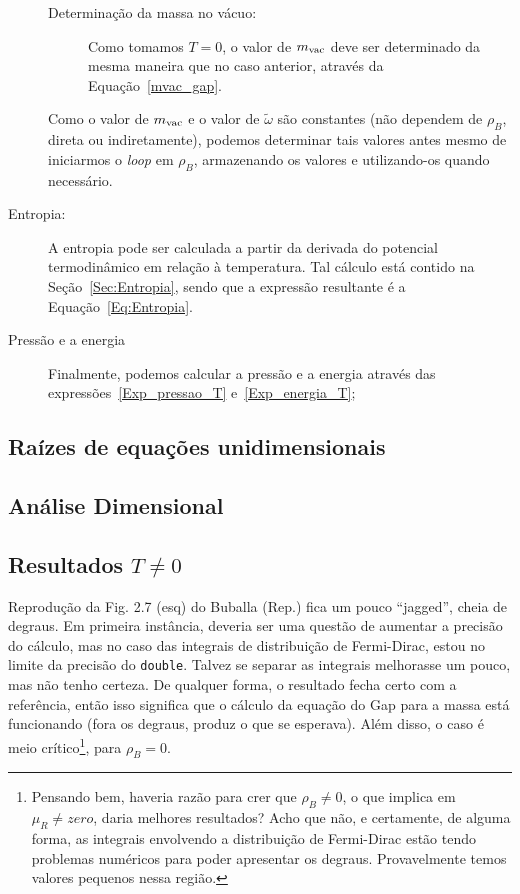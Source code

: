 \begin{description}
\begin{description}
\begin{equation}
				\end{equation}
			\item[Determinação da massa no vácuo:] Como tomamos $T = 0$, o valor de $m_{\rm{vac}}$ deve ser determinado da mesma maneira que no caso anterior, através da Equação~\eqref{mvac_gap}.
		\end{description}
		Como o valor de $m_{\rm{vac}}$ e o valor de $\tilde\omega$ são constantes (não dependem de $\rho_B$, direta ou indiretamente), podemos determinar tais valores antes mesmo de iniciarmos o \emph{loop} em $\rho_B$, armazenando os valores e utilizando-os quando necessário.
	\item[Entropia:] A entropia pode ser calculada a partir da derivada do potencial termodinâmico em relação à temperatura. Tal cálculo está contido na Seção~\ref{Sec:Entropia}, sendo que a expressão resultante é a Equação~\eqref{Eq:Entropia}.
	\item[Pressão e a energia] Finalmente, podemos calcular a pressão e a energia através das expressões~\eqref{Exp_pressao_T} e~\eqref{Exp_energia_T};
\end{description}

\subsection{Raízes de equações unidimensionais}

\subsection{Análise Dimensional}

\subsection{Resultados $T \neq 0$}

Reprodução da Fig. 2.7 (esq) do Buballa (Rep.) fica um pouco ``jagged'', cheia de degraus. Em primeira instância, deveria ser uma questão de aumentar a precisão do cálculo, mas no caso das integrais de distribuição de Fermi-Dirac, estou no limite da precisão do \texttt{double}. Talvez se separar as integrais melhorasse um pouco, mas não tenho certeza. De qualquer forma, o resultado fecha certo com a referência, então isso significa que o cálculo da equação do Gap para a massa está funcionando (fora os degraus, produz o que se esperava). Além disso, o caso é meio crítico\footnote{Pensando bem, haveria razão para crer que $\rho_B \neq 0$, o que implica em $\mu_R \neq zero$, daria melhores resultados? Acho que não, e certamente, de alguma forma, as integrais envolvendo a distribuição de Fermi-Dirac estão tendo problemas numéricos para poder apresentar os degraus. Provavelmente temos valores pequenos nessa região.}, para $\rho_B = 0$. 

